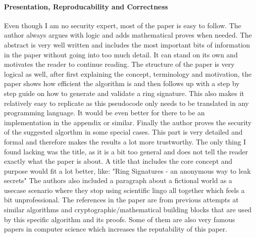 \documentclass{scrartcl}[11pt]
\begin{document}
\paragraph{Presentation, Reproducability and Correctness}{
Even though I am no security expert, most of the paper is easy to follow. The author always argues with logic and adds mathematical proves when needed. 
The abstract is very well written and includes the most important bits of information in the paper without going into too much detail. It can stand on its own and motivates the reader to continue reading. The structure of the paper is very logical as well, after first explaining the concept,  terminology and motivation, the paper shows how efficient the algorithm is and then follows up with a step by step guide on how to generate and validate a ring signature. This also makes it relatively easy to replicate as this pseudocode only needs to be translated in any programming language. It would be even better for there to be an implementation in the appendix or similar. Finally the author proves the security of the suggested algorthm in some special cases. This part is very detailed and formal and therefore makes the results a lot more trustworthy.
The only thing I found lacking was the title, as it is a bit too general and does not tell the reader exactly what the paper is about. A title that includes the core concept and purpose would fit a lot better, like: "Ring Signatures - an anonymous way to leak secrets" 
The authors also included a paragraph about a fictional world as a usecase scenario where they stop using scientific lingo all together which feels a bit unprofessional.
The references in the paper are from previous attempts at similar algorithms and cryptographic/mathematical building blocks that are used by this specific algorithm and its proofs. Some of them are also very famous papers in computer science which increases the reputability of this paper.
}





\end{document}
